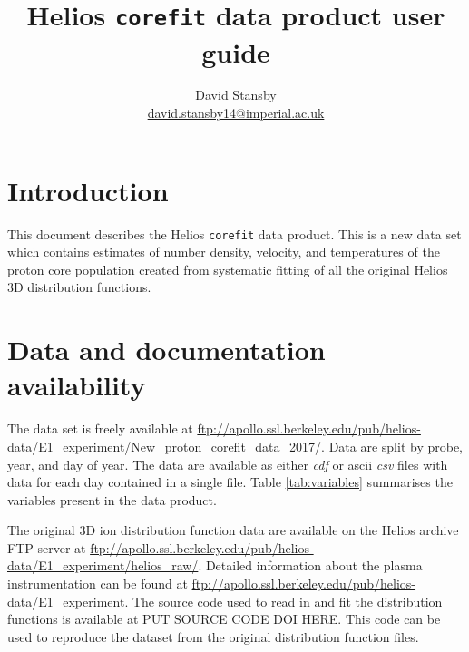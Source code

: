 \documentclass[11pt,a4paper]{article}
\begin{document}
\title{Helios \texttt{corefit} data product user guide}
\author{David Stansby \\
\href{mailto:david.stansby14@imperial.ac.uk}{david.stansby14@imperial.ac.uk}}
\maketitle

\section{Introduction}
This document describes the Helios \texttt{corefit} data product. This is a new data set which contains estimates of number density, velocity, and temperatures of the proton core population created from systematic fitting of all the original Helios 3D distribution functions.

\section{Data and documentation availability}
The data set is freely available at \url{ftp://apollo.ssl.berkeley.edu/pub/helios-data/E1_experiment/New_proton_corefit_data_2017/}. Data are split by probe, year, and day of year. The data are available as either \emph{cdf} or ascii \emph{csv} files with data for each day contained in a single file. Table \ref{tab:variables} summarises the variables present in the data product.

The original 3D ion distribution function data are available on the Helios archive FTP server at \url{ftp://apollo.ssl.berkeley.edu/pub/helios-data/E1_experiment/helios_raw/}. Detailed information about the plasma instrumentation can be found at \url{ftp://apollo.ssl.berkeley.edu/pub/helios-data/E1_experiment}. The source code used to read in and fit the distribution functions is available at PUT SOURCE CODE DOI HERE. This code can be used to reproduce the dataset from the original distribution function files.
\end{document}
